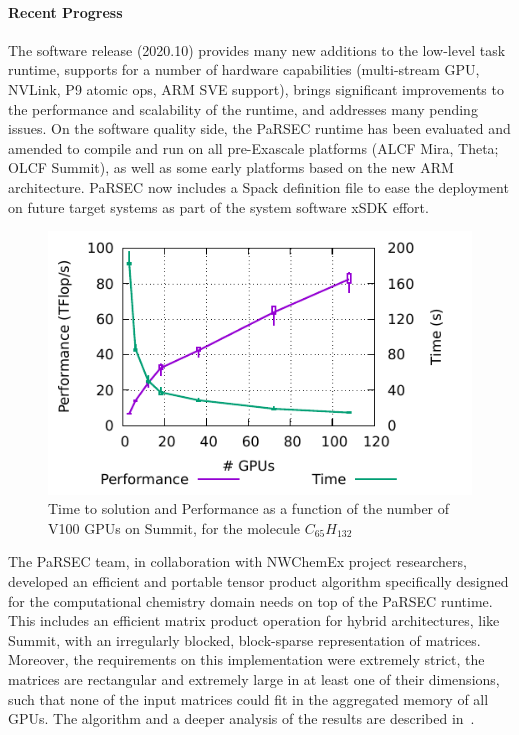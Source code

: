 \paragraph{Recent Progress}

The software release (2020.10) provides many new additions to the low-level task
runtime, supports for a number of hardware capabilities (multi-stream GPU, NVLink,
P9 atomic ops, ARM SVE support), brings significant improvements to the performance
and scalability of the runtime, and addresses many pending issues.
%
%
On the software quality side, the PaRSEC runtime has been evaluated and amended
to compile and run on all pre-Exascale platforms (ALCF Mira, Theta; OLCF
Summit), as well as some early platforms based on the new ARM architecture.
PaRSEC now includes a Spack definition file to ease the deployment on
future target systems as part of the system software xSDK effort.

%
%

\begin{figure}
\centering\includegraphics[width=.9\linewidth]{projects/2.3.1-PMR/2.3.1.09-ParSEC/irr-bs-gemm-combined.pdf}
\caption{Time to solution and Performance as a function of the number
  of V100 GPUs on Summit, for the molecule
  $C_{65}H_{132}$\label{fig:irrbsgemm}}
\end{figure}
The PaRSEC team, in collaboration with NWChemEx project researchers,
developed an efficient and portable tensor product algorithm
specifically designed for the computational chemistry domain needs on
top of the PaRSEC runtime. This includes an efficient matrix product
operation for hybrid architectures, like Summit, with an irregularly
blocked, block-sparse representation of matrices. Moreover, the
requirements on this implementation were extremely strict, the
matrices are rectangular and extremely large in at least one of their
dimensions, such that none of the input matrices could fit in the
aggregated memory of all GPUs. The algorithm and a deeper analysis of
the results are described in~\cite{parsec::rr::irrbs}.

